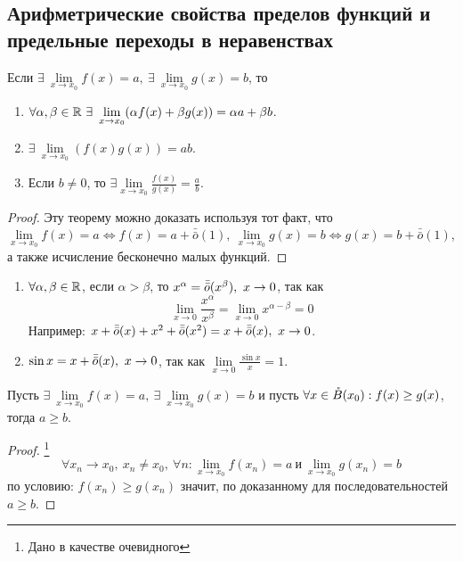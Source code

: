     \subsection{Арифметрические свойства пределов функций и предельные переходы в неравенствах}
        \begin{theorem}
            Если $\exists\ \lim\limits_{x\to x_0}f(x)=a,\ \exists\ \lim\limits_{x\to x_0}g(x)=b$, то
            \begin{enumerate}
                \item $\forall \alpha,\beta\in \R\ \exists\ \lim\limits_{x\to x_0}(\alpha f(x)+\beta g(x))=\alpha a+\beta b$.
                \item $\exists\ \lim\limits_{x\to x_0}(f(x)g(x))=ab$.
                \item Если $b\ne 0$, то $\exists \lim\limits_{x\to x_0}\frac{f(x)}{g(x)}=\frac{a}{b}$.
            \end{enumerate}
        \end{theorem} 
        \begin{proof}
            Эту теорему можно доказать используя тот факт, что\\
            $\lim\limits_{x\to x_0}f(x)=a \Leftrightarrow f(x)=a+\bar{\bar{o}}{(1)},\ \lim\limits_{x\to x_0}g(x)=b \Leftrightarrow g(x)=b+\bar{\bar{o}}{(1)}$, а также исчисление бесконечно малых функций.
        \end{proof}
        \begin{example}\tab
            \begin{enumerate}
                \item $\forall \alpha,\beta\in \mathbb{R}$, если $\alpha>\beta$, то $x^{\alpha}=\bar{\bar{o}}(x^{\beta}),\ x\to 0$, так как
                \[\lim\limits_{x\to 0}\frac{x^{\alpha}}{x^{\beta}}=\lim\limits_{x\to 0}x^{\alpha-\beta}=0\]
                Например: $x+\om(x)+x^2+\om(x^2)=x+\om(x),\ x\to 0$.
                \item $\sin{x}=x+\bar{\bar{o}}(x),\ x\to 0$, так как $\lim\limits_{x\to 0}\frac{\sin{x}}{x}=1$.
            \end{enumerate}
        \end{example}
        \begin{theorem}
            Пусть $\exists\ \lim\limits_{x\to x_0}f(x)=a,\ \exists\ \lim\limits_{x\to x_0}g(x)=b$ и пусть $\forall x\in \mathring{B}(x_0):\\
            f(x)\geq g(x)$, тогда $a\geq b$.
        \end{theorem} 
        \begin{proof}\footnote{Дано в качестве очевидного}
            \[\forall x_n \to x_0,\ x_n\ne x_0,\ \forall n: \lim\limits_{x\to x_0} f(x_n)=a\ \text{и}\ \lim\limits_{x\to x_0} g(x_n)=b\] 
            по условию: $f(x_n)\geq g(x_n)$ значит, по доказанному для последовательностей $a\geq b$.
        \end{proof} 

